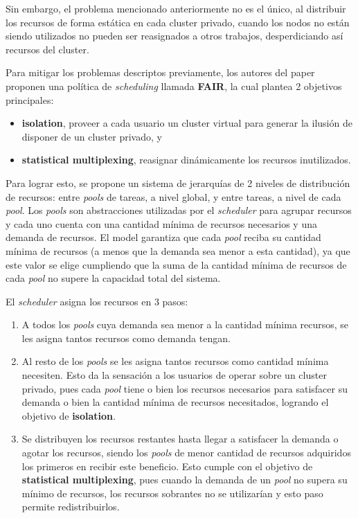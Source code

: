 \documentclass[a4paper]{article}
\begin{document}
Sin embargo, el problema mencionado anteriormente no es el único, al distribuir los recursos de forma estática en cada cluster privado, cuando los nodos no están siendo utilizados no pueden ser reasignados a otros trabajos, desperdiciando así recursos del cluster.

Para mitigar los problemas descriptos previamente, los autores del paper proponen una política de \textit{scheduling} llamada \textbf{FAIR}, la cual plantea 2 objetivos principales:
\begin{itemize}
  \item \textbf{isolation}, proveer a cada usuario un cluster virtual para generar la ilusión de disponer de un cluster privado, y
	\item \textbf{statistical multiplexing}, reasignar dinámicamente los recursos inutilizados.
\end{itemize}

Para lograr esto, se propone un sistema de jerarquías de 2 niveles de distribución de recursos: entre \textit{pools} de tareas, a nivel global, y entre tareas, a nivel de cada \textit{pool}. Los \textit{pools} son abstracciones utilizadas por el \textit{scheduler} para agrupar recursos y cada uno cuenta con una cantidad mínima de recursos necesarios y una demanda de recursos. El model garantiza que cada \textit{pool} reciba su cantidad mínima de recursos (a menos que la demanda sea menor a esta cantidad), ya que este valor se elige cumpliendo que la suma de la cantidad mínima de recursos de cada \textit{pool} no supere la capacidad total del sistema.

El \textit{scheduler} asigna los recursos en 3 pasos:
\begin{enumerate}
	\item A todos los \textit{pools} cuya demanda sea menor a la cantidad mínima recursos, se les asigna tantos recursos como demanda tengan.
	\item Al resto de los \textit{pools} se les asigna tantos recursos como cantidad mínima necesiten. Esto da la sensación a los usuarios de operar sobre un cluster privado, pues cada \textit{pool} tiene o bien los recursos necesarios para satisfacer su demanda o bien la cantidad mínima de recursos necesitados, logrando el objetivo de \textbf{isolation}.
	\item Se distribuyen los recursos restantes hasta llegar a satisfacer la demanda o agotar los recursos, siendo los \textit{pools} de menor cantidad de recursos adquiridos los primeros en recibir este beneficio. Esto cumple con el objetivo de \textbf{statistical multiplexing}, pues cuando la demanda de un \textit{pool} no supera su mínimo de recursos, los recursos sobrantes no se utilizarían y esto paso permite redistribuirlos.
\end{enumerate}
\end{document}
